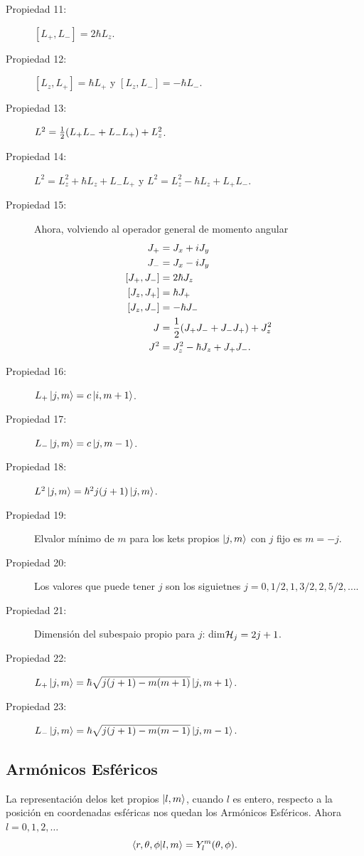 \begin{description}
	\item[Propiedad 11: ] $[L_+ ,L_-] = 2\hbar L_z$.
	\item[Propiedad 12: ] $[L_z ,L_+] = \hbar L_+$ y $[L_z ,L_-] = -\hbar L_-$.
	\item[Propiedad 13: ] $L^2 = \frac{1}{2} \qty(L_+ L_- + L_- L_+) + L_z ^2$.
	\item[Propiedad 14: ] $L^2 = L_z ^2 + \hbar L_z + L_- L_+$ y $L^2 = L_z ^2 - \hbar L_z + L_+ L_-$.
	\item[Propiedad 15: ] Ahora, volviendo al operador general de momento angular
		\begin{align*}
			J_+ &= J_x + iJ_y \\
			J_- &= J_x - iJ_y \\
			[J_+ ,J_-] &= 2\hbar J_z \\
			[J_z ,J_+] &= \hbar J_+ \\
			[J_z ,J_-] &= -\hbar J_- \\
			J &= \frac{1}{2} \qty(J_+ J_- + J_- J_+) + J_z ^2 \\
			J^2 &= J_z ^2 - \hbar J_z + J_+ J_-.
		\end{align*}
	\item[Propiedad 16: ] $L_+ \ket{j,m} = c\ket{i,m+1}$.
	\item[Propiedad 17: ] $L_- \ket{j,m} = c\ket{j,m-1}$.
	\item[Propiedad 18: ] $L^2 \ket{j,m} = \hbar ^2 j(j + 1) \ket{j,m}$.
	\item[Propiedad 19: ] Elvalor mínimo de $m$ para los kets propios $\ket{j,m}$ con $j$ fijo es $m=-j$.
	\item[Propiedad 20: ] Los valores que puede tener $j$ son los siguietnes $j = 0, 1/2, 1, 3/2, 2, 5/2, \ldots$.
	\item[Propiedad 21: ] Dimensión del subespaio propio para $j$: dim$\mathcal{H} _j = 2j+1$.
	\item[Propiedad 22: ] $L_+ \ket{j,m} = \hbar \sqrt{j(j+1) - m(m + 1)} \ket{j,m + 1}$.
	\item[Propiedad 23: ] $L_- \ket{j,m} = \hbar \sqrt{j(j+1) - m(m - 1)} \ket{j,m - 1}$.
\end{description}


\subsection{Armónicos Esféricos}
La representación delos ket propios $\ket{l,m}$, cuando $l$ es entero, respecto a la posición en coordenadas esféricas nos quedan los Armónicos Esféricos. Ahora $l=0,1,2,\ldots$
	\begin{equation}
		\braket{r,\theta ,\phi}{l,m} = Y_l ^m (\theta ,\phi).
	\end{equation}

